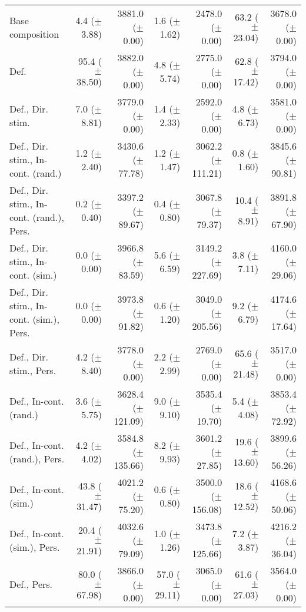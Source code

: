 \begin{table*}
\begin{tabular}{lrrrrrr}
        Base composition & 4.4 ($\pm$ 3.88) & 3881.0 ($\pm$ 0.00) & 1.6 ($\pm$ 1.62) & 2478.0 ($\pm$ 0.00) & 63.2 ($\pm$ 23.04) & 3678.0 ($\pm$ 0.00) \\
        Def. & 95.4 ($\pm$ 38.50) & 3882.0 ($\pm$ 0.00) & 4.8 ($\pm$ 5.74) & 2775.0 ($\pm$ 0.00) & 62.8 ($\pm$ 17.42) & 3794.0 ($\pm$ 0.00) \\
        Def., Dir. stim. & 7.0 ($\pm$ 8.81) & 3779.0 ($\pm$ 0.00) & 1.4 ($\pm$ 2.33) & 2592.0 ($\pm$ 0.00) & 4.8 ($\pm$ 6.73) & 3581.0 ($\pm$ 0.00) \\
        Def., Dir. stim., In-cont. (rand.) & 1.2 ($\pm$ 2.40) & 3430.6 ($\pm$ 77.78) & 1.2 ($\pm$ 1.47) & 3062.2 ($\pm$ 111.21) & 0.8 ($\pm$ 1.60) & 3845.6 ($\pm$ 90.81) \\
        Def., Dir. stim., In-cont. (rand.), Pers. & 0.2 ($\pm$ 0.40) & 3397.2 ($\pm$ 89.67) & 0.4 ($\pm$ 0.80) & 3067.8 ($\pm$ 79.37) & 10.4 ($\pm$ 8.91) & 3891.8 ($\pm$ 67.90) \\
        Def., Dir. stim., In-cont. (sim.) & 0.0 ($\pm$ 0.00) & 3966.8 ($\pm$ 83.59) & 5.6 ($\pm$ 6.59) & 3149.2 ($\pm$ 227.69) & 3.8 ($\pm$ 7.11) & 4160.0 ($\pm$ 29.06) \\
        Def., Dir. stim., In-cont. (sim.), Pers. & 0.0 ($\pm$ 0.00) & 3973.8 ($\pm$ 91.82) & 0.6 ($\pm$ 1.20) & 3049.0 ($\pm$ 205.56) & 9.2 ($\pm$ 6.79) & 4174.6 ($\pm$ 17.64) \\
        Def., Dir. stim., Pers. & 4.2 ($\pm$ 8.40) & 3778.0 ($\pm$ 0.00) & 2.2 ($\pm$ 2.99) & 2769.0 ($\pm$ 0.00) & 65.6 ($\pm$ 21.48) & 3517.0 ($\pm$ 0.00) \\
        Def., In-cont. (rand.) & 3.6 ($\pm$ 5.75) & 3628.4 ($\pm$ 121.09) & 9.0 ($\pm$ 9.10) & 3535.4 ($\pm$ 19.70) & 5.4 ($\pm$ 4.08) & 3853.4 ($\pm$ 72.92) \\
        Def., In-cont. (rand.), Pers. & 4.2 ($\pm$ 4.02) & 3584.8 ($\pm$ 135.66) & 8.2 ($\pm$ 9.93) & 3601.2 ($\pm$ 27.85) & 19.6 ($\pm$ 13.60) & 3899.6 ($\pm$ 56.26) \\
        Def., In-cont. (sim.) & 43.8 ($\pm$ 31.47) & 4021.2 ($\pm$ 75.20) & 0.6 ($\pm$ 0.80) & 3500.0 ($\pm$ 156.08) & 18.6 ($\pm$ 12.52) & 4168.6 ($\pm$ 50.06) \\
        Def., In-cont. (sim.), Pers. & 20.4 ($\pm$ 21.91) & 4032.6 ($\pm$ 79.09) & 1.0 ($\pm$ 1.26) & 3473.8 ($\pm$ 125.66) & 7.2 ($\pm$ 3.87) & 4216.2 ($\pm$ 36.04) \\
        Def., Pers. & 80.0 ($\pm$ 67.98) & 3866.0 ($\pm$ 0.00) & 57.0 ($\pm$ 29.11) & 3065.0 ($\pm$ 0.00) & 61.6 ($\pm$ 27.03) & 3564.0 ($\pm$ 0.00) \\

\end{tabular}
\end{table*}
